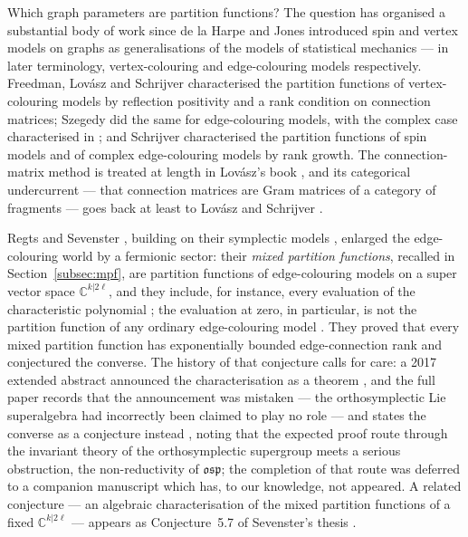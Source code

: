 \documentclass[11pt]{article}
\begin{document}
Which graph parameters are partition functions? The question has
organised a substantial body of work since de la Harpe and Jones
\cite{dHJ93} introduced spin and vertex models on graphs as
generalisations of the models of statistical mechanics --- in
later terminology, vertex-colouring and edge-colouring models
respectively. Freedman,
Lov\'asz and Schrijver \cite{FLS07} characterised the partition
functions of vertex-colouring models by reflection positivity and
a rank condition on connection matrices; Szegedy \cite{Sze07} did
the same for edge-colouring models, with the complex case
characterised in \cite{DGLRS12}; and Schrijver characterised
the partition functions of spin models \cite{Sch13} and of
complex edge-colouring models \cite{Sch15} by rank growth.
The connection-matrix method is treated at length in Lov\'asz's
book \cite{Lov12}, and its categorical undercurrent --- that
connection matrices are Gram matrices of a category of fragments
--- goes back at least to Lov\'asz and Schrijver \cite{LS09}.

Regts and Sevenster \cite{RS21}, building on their symplectic
models \cite{RS17}, enlarged the edge-colouring world by a
fermionic sector: their \emph{mixed partition functions},
recalled in Section~\ref{subsec:mpf}, are partition functions of
edge-colouring models on a super vector space
$\mathbb{C}^{k|2\ell}$, and they include, for instance, every
evaluation of the characteristic polynomial
\cite[Prop.~10]{RS21}; the evaluation at zero, in particular, is
not the partition function of any ordinary edge-colouring model
\cite[Prop.~9]{RS21}. They proved that every mixed
partition function has exponentially bounded edge-connection rank
\cite[Thm~6]{RS21} and conjectured the converse. The history of
that conjecture calls for care: a 2017 extended abstract
announced the characterisation as a theorem
\cite[Thm~3.1]{RS17ea}, and
the full paper records that the announcement was mistaken --- the
orthosymplectic Lie superalgebra had incorrectly been claimed to
play no role --- and states the converse as a conjecture instead
\cite[abstract and footnotes~1--2]{RS21}, noting that the
expected proof route
through the invariant theory of the orthosymplectic supergroup
meets a serious obstruction, the non-reductivity of
$\mathfrak{osp}$; the completion of that route was deferred to a
companion manuscript which has, to our knowledge, not appeared.
A related
conjecture --- an algebraic characterisation of the mixed
partition functions of a fixed $\mathbb{C}^{k|2\ell}$ --- appears
as Conjecture~5.7 of Sevenster's thesis \cite{Sev18}.
\end{document}
